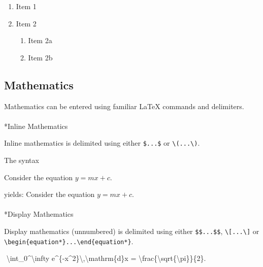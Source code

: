 \documentclass[
  letterpaper,
]{article}
\makeatletter
\let\oldparagraph\paragraph
\renewcommand{\paragraph}{
    \@ifstar
      \xxxParagraphStar
      \xxxParagraphNoStar
  }
\newcommand{\xxxParagraphStar}[1]{\oldparagraph*{#1}\mbox{}}
\newcommand{\xxxParagraphNoStar}[1]{\oldparagraph{#1}\mbox{}}
\newenvironment{Shaded}{\begin{snugshade}}{\end{snugshade}}
\newcommand{\NormalTok}[1]{\textcolor[rgb]{0.00,0.23,0.31}{#1}}
\providecommand{\tightlist}{%
  \setlength{\itemsep}{0pt}\setlength{\parskip}{0pt}}\usepackage{longtable,booktabs,array}
\numberwithin{equation}{section}
\numberwithin{figure}{section}
\theoremstyle{break}
\makeatother
\begin{document}
\begin{enumerate}
\def\labelenumi{\arabic{enumi}.}
\tightlist
\item
  Item 1
\item
  Item 2

  \begin{enumerate}
  \def\labelenumii{\alph{enumii}.}
  \tightlist
  \item
    Item 2a
  \item
    Item 2b
  \end{enumerate}
\end{enumerate}

\subsection{Mathematics}\label{mathematics}

Mathematics can be entered using familiar LaTeX commands and delimiters.

\paragraph*{Inline Mathematics}\label{inline-mathematics}

Inline mathematics is delimited using either \texttt{\$...\$} or
\texttt{\textbackslash{}(...\textbackslash{})}.

The syntax

\begin{Shaded}
\begin{Highlighting}[]
\NormalTok{Consider the equation $y = mx+c$.}
\end{Highlighting}
\end{Shaded}

yields: Consider the equation \(y = mx+c\).

\paragraph*{Display Mathematics}\label{display-mathematics}

Display mathematics (unnumbered) is delimited using either
\texttt{\$\$...\$\$}, \texttt{\textbackslash{}{[}...\textbackslash{}{]}}
or
\texttt{\textbackslash{}begin\{equation*\}...\textbackslash{}end\{equation*\}}.

\begin{Shaded}
\begin{Highlighting}[]
\NormalTok{$$}
\NormalTok{ \textbackslash{}int\_0\^{}\textbackslash{}infty e\^{}\{{-}x\^{}2\}\textbackslash{},\textbackslash{}mathrm\{d\}x = \textbackslash{}frac\{\textbackslash{}sqrt\{\textbackslash{}pi\}\}\{2\}. }
\NormalTok{$$}
\end{Highlighting}
\end{Shaded}
\end{document}
